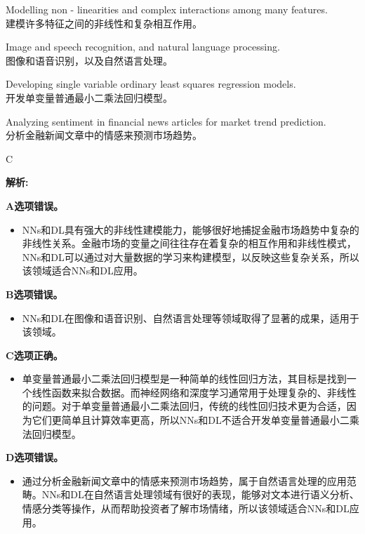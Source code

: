 \documentclass{article}
\newenvironment{explanation}
{\textbf{解析:}\par}
{\par}
\begin{document}
        \begin{choices}
            \item Modelling non - linearities and complex interactions among many features.\\
            建模许多特征之间的非线性和复杂相互作用。
            \item Image and speech recognition, and natural language processing.\\
            图像和语音识别，以及自然语言处理。
            \item Developing single variable ordinary least squares regression models.\\
            开发单变量普通最小二乘法回归模型。
            \item Analyzing sentiment in financial news articles for market trend prediction.\\
            分析金融新闻文章中的情感来预测市场趋势。
        \end{choices}
        
        \begin{correctanswer}
            C
        \end{correctanswer}
        
        \begin{explanation}
        \textbf{A选项错误。}
        \begin{itemize}
            \item NNs和DL具有强大的非线性建模能力，能够很好地捕捉金融市场趋势中复杂的非线性关系。金融市场的变量之间往往存在着复杂的相互作用和非线性模式，NNs和DL可以通过对大量数据的学习来构建模型，以反映这些复杂关系，所以该领域适合NNs和DL应用。
        \end{itemize}
        \textbf{B选项错误。}
        \begin{itemize}
            \item NNs和DL在图像和语音识别、自然语言处理等领域取得了显著的成果，适用于该领域。
        \end{itemize}
        \textbf{C选项正确。}
        \begin{itemize}
            \item 单变量普通最小二乘法回归模型是一种简单的线性回归方法，其目标是找到一个线性函数来拟合数据。而神经网络和深度学习通常用于处理复杂的、非线性的问题。对于单变量普通最小二乘法回归，传统的线性回归技术更为合适，因为它们更简单且计算效率更高，所以NNs和DL不适合开发单变量普通最小二乘法回归模型。
        \end{itemize}
        \textbf{D选项错误。}
        \begin{itemize}
            \item 通过分析金融新闻文章中的情感来预测市场趋势，属于自然语言处理的应用范畴。NNs和DL在自然语言处理领域有很好的表现，能够对文本进行语义分析、情感分类等操作，从而帮助投资者了解市场情绪，所以该领域适合NNs和DL应用。
        \end{itemize}
        \end{explanation}
        
\end{document}
